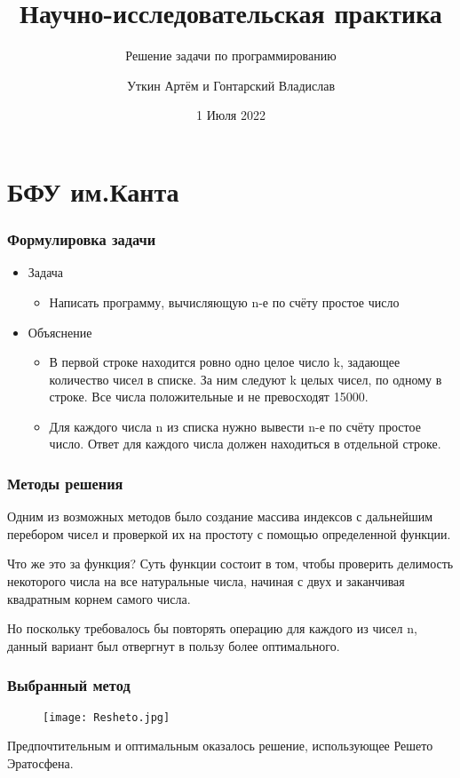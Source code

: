 \documentclass[10pt,pdf,hyperref={unicode}]{beamer}
\title{Научно-исследовательская практика}
\author{Уткин Артём и Гонтарский Владислав}
\date{1 Июля 2022}
\institute {ИФМНиИТ БФУ им.Канта}
\subtitle{Решение задачи по программированию}
\begin{document}
\begin{frame}
\titlepage
\end{frame}
\section{БФУ им.Канта}

\begin{frame}
\frametitle{Формулировка задачи}
\begin{itemize}
\item Задача
\begin{itemize}
\item Написать программу, вычисляющую n-е по счёту простое число
\end{itemize}
\item Объяснение
\begin{itemize}
\item В первой строке находится ровно одно целое число k, задающее количество чисел в списке. За ним следуют k целых чисел, по одному в строке. Все числа положительные и не превосходят 15000.
\item Для каждого числа n из списка нужно вывести n-е по счёту простое число. Ответ для каждого числа должен находиться в отдельной строке.
\end{itemize}
\end{itemize}
\end{frame}

\begin{frame}
\frametitle{Методы решения}

Одним из возможных методов было создание массива индексов с дальнейшим перебором чисел и проверкой их на простоту с помощью определенной функции. 
\begin{block}{Что же это за функция?}
Суть функции состоит в том, чтобы проверить делимость некоторого числа на все натуральные числа, начиная с двух и заканчивая квадратным корнем самого числа.
\end{block}
Но поскольку требовалось бы повторять операцию для каждого из чисел n, данный вариант был отвергнут в пользу более оптимального.
\end{frame}

\begin{frame}
\frametitle{Выбранный метод}
\begin{figure}
\texttt{[image: Resheto.jpg]}
\end{figure}
\centering
Предпочтительным и оптимальным оказалось решение, использующее Решето Эратосфена.
\end{frame}
\end{document}
